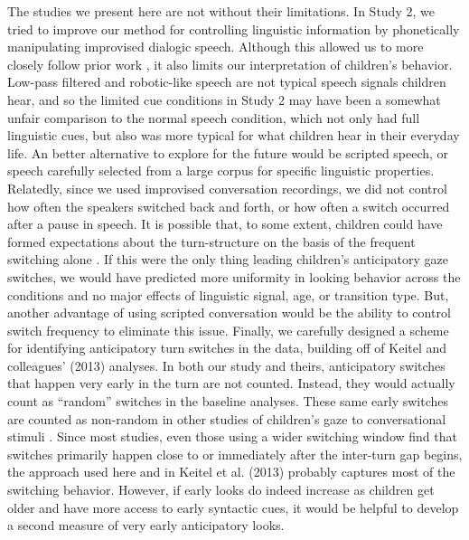 \documentclass[authoryear, 12pt]{elsarticle}
\begin{document}
The studies we present here are not without their limitations. In Study 2, we tried to improve our method for controlling linguistic information by phonetically manipulating improvised dialogic speech. Although this allowed us to more closely follow prior work \cite{de-ruiter2006, keitel2013}, it also limits our interpretation of children's behavior. Low-pass filtered and robotic-like speech are not typical speech signals children hear, and so the limited cue conditions in Study 2 may have been a somewhat unfair comparison to the normal speech condition, which not only had full linguistic cues, but also was more typical for what children hear in their everyday life. An better alternative to explore for the future would be scripted speech, or speech carefully selected from a large corpus for specific linguistic properties. Relatedly, since we used improvised conversation recordings, we did not control how often the speakers switched back and forth, or how often a switch occurred after a pause in speech. It is possible that, to some extent, children could have formed expectations about the turn-structure on the basis of the frequent switching alone \citep[see, e.g., ][]{thorgrimssonUndRev}. If this were the only thing leading children's anticipatory gaze switches, we would have predicted more uniformity in looking behavior across the conditions and no major effects of linguistic signal, age, or transition type. But, another advantage of using scripted conversation would be the ability to control switch frequency to eliminate this issue. Finally, we carefully designed a scheme for identifying anticipatory turn switches in the data, building off of Keitel and colleagues' (2013) analyses. In both our study and theirs, anticipatory switches that happen very early in the turn are not counted. Instead, they would actually count as ``random'' switches in the baseline analyses. These same early switches are counted as non-random in other studies of children's gaze to conversational stimuli \citep{bakker2011, hofsten2009}. Since most studies, even those using a wider switching window \citep[e.g., ][]{hirvenkari2013} find that switches primarily happen close to or immediately after the inter-turn gap begins, the approach used here and in Keitel et al. (2013) probably captures most of the switching behavior. However, if early looks do indeed increase as children get older and have more access to early syntactic cues, it would be helpful to develop a second measure of very early anticipatory looks.




\end{document}
